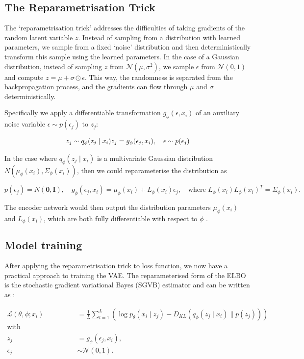 \documentclass{mldsmsc}
\begin{document}
\subsection{The Reparametrisation Trick}
The `reparametrisation trick' addresses the difficulties of taking gradients of the random latent variable $z$. Instead of sampling from a distribution with learned parameters, we sample from a fixed `noise' distribution and then deterministically transform this sample using the learned parameters. In the case of a Gaussian distribution, instead of sampling \( z \) from \( \mathcal{N}(\mu, \sigma^2) \), we sample \( \epsilon \) from \( \mathcal{N}(0, 1) \) and compute \( z = \mu + \sigma \odot \epsilon \). This way, the randomness is separated from the backpropagation process, and the gradients can flow through \( \mu \) and \( \sigma \) deterministically.

Specifically we apply a differentiable transformation $g_\phi(\epsilon, x_i)$ of an auxiliary noise variable $\epsilon\sim p(\epsilon_j)$ to $z_j$:

$$
z_j \sim q_\phi(z_j\mid x_i)\\
z_j = g_\phi(\epsilon_j, x_i),\quad \epsilon\sim p(\epsilon_j)
$$

In the case where $q_\phi(z_j\mid x_i)$ is a multivariate Gaussian distribution $N(\mu_\phi(x_i), \Sigma_\phi(x_i))$, then we could reparameterise the distribution as 

$$
p(\epsilon_j)=N(\mathbf{0},\mathbf{I}),\quad g_\phi(\epsilon_j,x_i)=\mu_\phi(x_i)+L_\phi(x_i)\epsilon_j,\quad \text{where }L_\phi(x_i)L_\phi(x_i)^T =\Sigma_\phi(x_i).
$$

The encoder network would then output the distribution parameters $\mu_\phi(x_i)$ and $L_\phi(x_i)$, which are both fully differentiable with respect to $\phi$ \citep{webster2023dl}. 

\subsection{Model training}
After applying the reparametrisation trick to loss function, we now have a practical approach to training the VAE. The reparameterised form of the ELBO is the stochastic gradient variational Bayes (SGVB) estimator and can be written as \citep{kingma2013auto}:

\begin{align}
	\mathcal{L}(\theta, \phi; x_i) &= \frac{1}{L} \sum_{l=1}^{L} \left( \log p_\theta(x_i \mid z_j) - D_{KL}(q_\phi(z_j \mid x_i) \parallel p(z_j)) \right) \label{SGVB} \\ 
	\text{with reparametrisations:} \quad \nonumber\\
	z_j&= g_\phi(\epsilon_j, x_i), \nonumber\\
	\epsilon_j&\sim \mathcal{N}(0, 1).\nonumber
\end{align}
\end{document}
